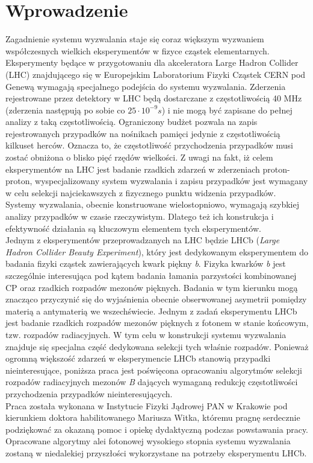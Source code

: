 \documentclass{pracamgr}
\begin{document}
\chapter*{Wprowadzenie}
\hspace{20pt}Zagadnienie systemu wyzwalania staje się coraz większym wyzwaniem współczesnych wielkich eksperymentów w fizyce cząstek elementarnych. Eksperymenty będące w przygotowaniu dla akceleratora Large Hadron Collider (LHC) znajdującego się w Europejskim Laboratorium Fizyki Cząstek CERN pod Genewą wymagają specjalnego podejścia do systemu wyzwalania. Zderzenia rejestrowane przez detektory w LHC będą dostarczane z częstotliwością 40 MHz (zderzenia następują po sobie co $25\cdot 10^{-9}s$) i nie mogą być zapisane do pełnej analizy z taką częstotliwością. Ograniczony budżet pozwala na zapis rejestrowanych przypadków na nośnikach pamięci jedynie z częstotliwością kilkuset herców. Oznacza to, że częstotliwość przychodzenia przypadków musi zostać obniżona o blisko pięć rzędów wielkości. Z uwagi na fakt, iż celem eksperymentów na LHC jest badanie rzadkich zdarzeń w zderzeniach proton-proton, wyspecjalizowany system wyzwalania i zapisu przypadków jest wymagany w celu selekcji najciekawszych z fizycznego punktu widzenia przypadków. Systemy wyzwalania, obecnie konstruowane wielostopniowo, wymagają szybkiej analizy przypadków w czasie rzeczywistym. Dlatego też ich konstrukcja i efektywność działania są kluczowym elementem tych eksperymentów.
\\
\indent
Jednym z eksperymentów przeprowadzanych na LHC będzie LHCb (\textit{Large Hadron Collider Beauty Experiment}), który jest dedykowanym eksperymentem do badania fizyki cząstek zawierających kwark piękny \textit{b}. Fizyka kwarków \textit{b} jest szczególnie interesująca pod kątem badania łamania parzystości kombinowanej CP oraz rzadkich rozpadów mezonów pięknych. Badania w tym kierunku mogą znacząco przyczynić się do wyjaśnienia obecnie obserwowanej asymetrii pomiędzy materią a antymaterią we wszechświecie. Jednym z zadań eksperymentu LHCb jest badanie rzadkich rozpadów mezonów pięknych z fotonem w stanie końcowym, tzw. rozpadów radiacyjnych. W tym celu w konstrukcji systemu wyzwalania znajduje się specjalna część dedykowana selekcji tych właśnie rozpadów. Ponieważ ogromną większość zdarzeń w eksperymencie LHCb stanowią przypadki nieinteresujące, poniższa praca jest poświęcona opracowaniu algorytmów selekcji rozpadów radiacyjnych mezonów \textit{B} dających wymaganą redukcję częstotliwości przychodzenia przypadków nieinteresujących.
\\
\indent
Praca została wykonana w Instytucie Fizyki Jądrowej PAN w Krakowie pod kierunkiem doktora habilitowanego Mariusza Witka, któremu pragnę serdecznie podziękować za okazaną pomoc i opiekę dydaktyczną podczas powstawania pracy. Opracowane algorytmy alei fotonowej wysokiego stopnia systemu wyzwalania zostaną w niedalekiej przyszłości wykorzystane na potrzeby eksperymentu LHCb.
\end{document}
